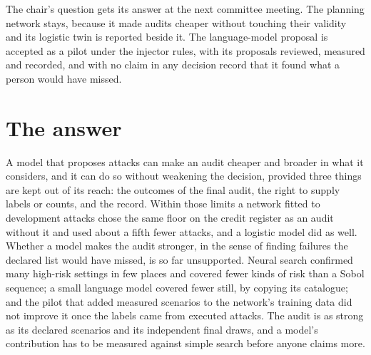 The chair's question gets its answer at the next committee meeting. The planning network
stays, because it made audits cheaper without touching their validity and its logistic
twin is reported beside it. The language-model proposal is accepted as a pilot under
the injector rules, with its proposals reviewed, measured and recorded, and with no
claim in any decision record that it found what a person would have missed.

\section{The answer}

A model that proposes attacks can make an audit cheaper and broader in what it
considers, and it can do so without weakening the decision, provided three things are
kept out of its reach: the outcomes of the final audit, the right to supply labels or
counts, and the record. Within those limits a network fitted to development attacks
chose the same floor on the credit register as an audit without it and used about a
fifth fewer attacks, and a logistic model did as well. Whether a model makes the audit
stronger, in the sense of finding failures the declared list would have missed, is so
far unsupported. Neural search confirmed many high-risk settings in few places and
covered fewer kinds of risk than a Sobol sequence; a small language model covered fewer
still, by copying its catalogue; and the pilot that added measured scenarios to the
network's training data did not improve it once the labels came from executed attacks.
The audit is as strong as its declared scenarios and its independent final draws, and a
model's contribution has to be measured against simple search before anyone claims
more.


